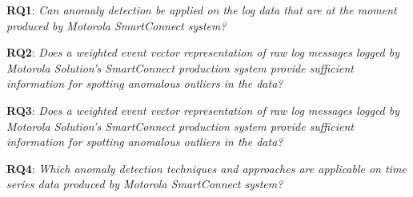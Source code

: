 \textbf{RQ1}: \textit{Can anomaly detection be applied on the log data that are at the moment produced by Motorola SmartConnect
system?}

\textbf{RQ2}: \textit{Does a weighted event vector representation of raw log messages logged by Motorola Solution’s SmartConnect production system provide sufficient information for spotting anomalous outliers in the data?}

\textbf{RQ3}: \textit{Does a weighted event vector representation of raw log messages logged by Motorola Solution’s SmartConnect production system provide sufficient information for spotting anomalous outliers in the data?}

\textbf{RQ4}: \textit{Which anomaly detection techniques and approaches are applicable on time series data produced by Motorola SmartConnect system?}